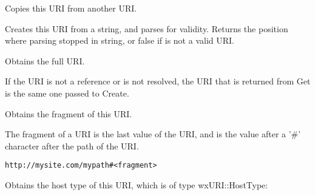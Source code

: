 


Copies this URI from another URI.



\label{wxuricreate}


Creates this URI from a string, and parses  for validity.
Returns the position where parsing stopped in string, 
or false if  is not a valid URI.


\label{wxuriget}


Obtains the full URI.

If the URI is not a reference or is not resolved, 
the URI that is returned from Get is the same one 
passed to Create.

\label{wxurigetfragment}


Obtains the fragment of this URI.

The fragment of a URI is the last value of the URI,
and is the value after a '#' character after the path 
of the URI.

\tt{http://mysite.com/mypath\#<fragment>}

\label{wxurigethosttype}


Obtains the host type of this URI, which is of type
wxURI::HostType:

\twocolwidtha{7cm}
\begin{twocollist}\itemsep=0pt
\end{twocollist}

\label{wxurigetpath}

